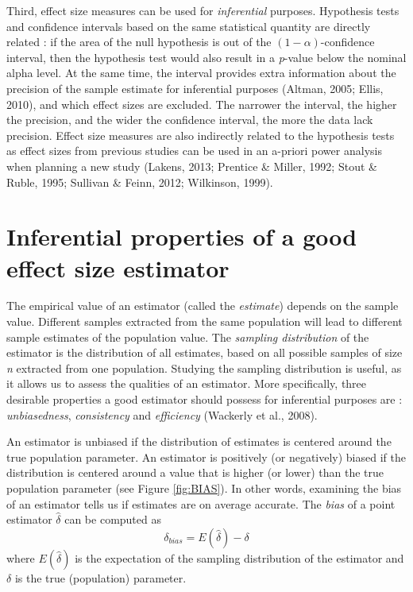 \documentclass[
  english,
  man,floatsintext]{apa6}
\begin{document}
Third, effect size measures can be used for \emph{inferential} purposes. Hypothesis tests and confidence intervals based on the same statistical quantity are directly related : if the area of the null hypothesis is out of the \((1-\alpha)\)-confidence interval, then the hypothesis test would also result in a \emph{p}-value below the nominal alpha level. At the same time, the interval provides extra information about the precision of the sample estimate for inferential purposes (Altman, 2005; Ellis, 2010), and which effect sizes are excluded. The narrower the interval, the higher the precision, and the wider the confidence interval, the more the data lack precision. Effect size measures are also indirectly related to the hypothesis tests as effect sizes from previous studies can be used in an a-priori power analysis when planning a new study (Lakens, 2013; Prentice \& Miller, 1992; Stout \& Ruble, 1995; Sullivan \& Feinn, 2012; Wilkinson, 1999).

\hypertarget{inferential-properties-of-a-good-effect-size-estimator}{%
\section{Inferential properties of a good effect size estimator}\label{inferential-properties-of-a-good-effect-size-estimator}}

The empirical value of an estimator (called the \emph{estimate}) depends on the sample value. Different samples extracted from the same population will lead to different sample estimates of the population value. The \emph{sampling distribution} of the estimator is the distribution of all estimates, based on all possible samples of size \emph{n} extracted from one population. Studying the sampling distribution is useful, as it allows us to assess the qualities of an estimator. More specifically, three desirable properties a good estimator should possess for inferential purposes are : \emph{unbiasedness}, \emph{consistency} and \emph{efficiency} (Wackerly et al., 2008).

An estimator is unbiased if the distribution of estimates is centered around the true population parameter. An estimator is positively (or negatively) biased if the distribution is centered around a value that is higher (or lower) than the true population parameter (see Figure \ref{fig:BIAS}). In other words, examining the bias of an estimator tells us if estimates are on average accurate. The \emph{bias} of a point estimator \(\hat{\delta}\) can be computed as
\begin{equation} 
\delta_{bias}=E(\hat{\delta})-\delta
\label{eqn:BIAS}
\end{equation}
where \(E(\hat{\delta})\) is the expectation of the sampling distribution of the estimator and \(\delta\) is the true (population) parameter.
\end{document}
